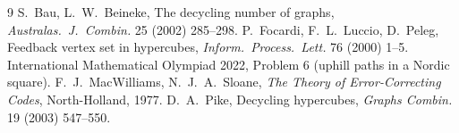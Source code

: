 \begin{thebibliography}{9}
 S.~Bau, L.~W.~Beineke, The decycling number of graphs, \emph{Australas.\ J.\ Combin.} 25 (2002) 285--298.
 P.~Focardi, F.~L.~Luccio, D.~Peleg, Feedback vertex set in hypercubes, \emph{Inform.\ Process.\ Lett.} 76 (2000) 1--5.
 International Mathematical Olympiad 2022, Problem 6 (uphill paths in a Nordic square).
 F.~J.~MacWilliams, N.~J.~A.~Sloane, \emph{The Theory of Error-Correcting Codes}, North-Holland, 1977.
 D.~A.~Pike, Decycling hypercubes, \emph{Graphs Combin.} 19 (2003) 547--550.
\end{thebibliography}
